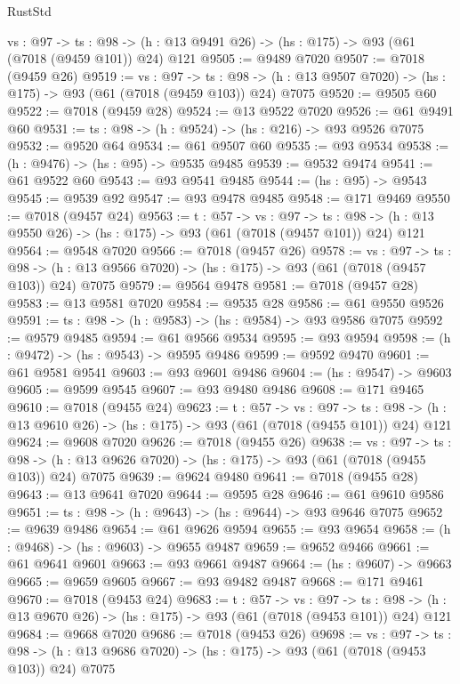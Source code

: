 \begin{lexlean}{RustStd}
\begin{coremodule}
  {vs : @97} ->
  {ts : @98} -> (h : @13 @9491 @26) -> (hs : @175) -> @93 (@61 (@7018 (@9459 @101)) @24) @121
@9505 := @9489 @7020
@9507 := @7018 (@9459 @26)
@9519 := {vs : @97} ->
  {ts : @98} -> (h : @13 @9507 @7020) -> (hs : @175) -> @93 (@61 (@7018 (@9459 @103)) @24) @7075
@9520 := @9505 @60
@9522 := @7018 (@9459 @28)
@9524 := @13 @9522 @7020
@9526 := @61 @9491 @60
@9531 := {ts : @98} -> (h : @9524) -> (hs : @216) -> @93 @9526 @7075
@9532 := @9520 @64
@9534 := @61 @9507 @60
@9535 := @93 @9534
@9538 := (h : @9476) -> (hs : @95) -> @9535 @9485
@9539 := @9532 @9474
@9541 := @61 @9522 @60
@9543 := @93 @9541 @9485
@9544 := (hs : @95) -> @9543
@9545 := @9539 @92
@9547 := @93 @9478 @9485
@9548 := @171 @9469
@9550 := @7018 (@9457 @24)
@9563 := {t : @57} ->
  {vs : @97} ->
  {ts : @98} -> (h : @13 @9550 @26) -> (hs : @175) -> @93 (@61 (@7018 (@9457 @101)) @24) @121
@9564 := @9548 @7020
@9566 := @7018 (@9457 @26)
@9578 := {vs : @97} ->
  {ts : @98} -> (h : @13 @9566 @7020) -> (hs : @175) -> @93 (@61 (@7018 (@9457 @103)) @24) @7075
@9579 := @9564 @9478
@9581 := @7018 (@9457 @28)
@9583 := @13 @9581 @7020
@9584 := @9535 @28
@9586 := @61 @9550 @9526
@9591 := {ts : @98} -> (h : @9583) -> (hs : @9584) -> @93 @9586 @7075
@9592 := @9579 @9485
@9594 := @61 @9566 @9534
@9595 := @93 @9594
@9598 := (h : @9472) -> (hs : @9543) -> @9595 @9486
@9599 := @9592 @9470
@9601 := @61 @9581 @9541
@9603 := @93 @9601 @9486
@9604 := (hs : @9547) -> @9603
@9605 := @9599 @9545
@9607 := @93 @9480 @9486
@9608 := @171 @9465
@9610 := @7018 (@9455 @24)
@9623 := {t : @57} ->
  {vs : @97} ->
  {ts : @98} -> (h : @13 @9610 @26) -> (hs : @175) -> @93 (@61 (@7018 (@9455 @101)) @24) @121
@9624 := @9608 @7020
@9626 := @7018 (@9455 @26)
@9638 := {vs : @97} ->
  {ts : @98} -> (h : @13 @9626 @7020) -> (hs : @175) -> @93 (@61 (@7018 (@9455 @103)) @24) @7075
@9639 := @9624 @9480
@9641 := @7018 (@9455 @28)
@9643 := @13 @9641 @7020
@9644 := @9595 @28
@9646 := @61 @9610 @9586
@9651 := {ts : @98} -> (h : @9643) -> (hs : @9644) -> @93 @9646 @7075
@9652 := @9639 @9486
@9654 := @61 @9626 @9594
@9655 := @93 @9654
@9658 := (h : @9468) -> (hs : @9603) -> @9655 @9487
@9659 := @9652 @9466
@9661 := @61 @9641 @9601
@9663 := @93 @9661 @9487
@9664 := (hs : @9607) -> @9663
@9665 := @9659 @9605
@9667 := @93 @9482 @9487
@9668 := @171 @9461
@9670 := @7018 (@9453 @24)
@9683 := {t : @57} ->
  {vs : @97} ->
  {ts : @98} -> (h : @13 @9670 @26) -> (hs : @175) -> @93 (@61 (@7018 (@9453 @101)) @24) @121
@9684 := @9668 @7020
@9686 := @7018 (@9453 @26)
@9698 := {vs : @97} ->
  {ts : @98} -> (h : @13 @9686 @7020) -> (hs : @175) -> @93 (@61 (@7018 (@9453 @103)) @24) @7075

\end{coremodule}
\end{lexlean}
